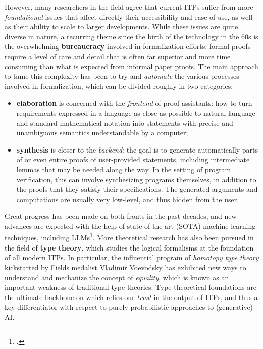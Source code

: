 \documentclass[12pt,draftproposal]{msca-pf}
\begin{document}
However, many researchers in the field agree that current ITPs suffer from more \emph{foundational}
issues that affect directly their accessibility and ease of use, as well as their ability to scale
to larger developments. While these issues are quite diverse in nature, a recurring theme since the
birth of the technology in the 60s is the overwhelming \textbf{bureaucracy} involved in
formalization efforts: formal proofs require a level of care and detail that is often far superior
and more time consuming than what is expected from informal paper proofs.
The main approach to tame this complexity has been to try and \emph{automate} the various processes
involved in formalization, which can be divided roughly in two categories:
\begin{itemize}
    \item \textbf{elaboration} is concerned with the \emph{frontend} of proof assistants: how to
    turn requirements expressed in a language as close as possible to natural language and
    standard mathematical notation into statements with precise and unambiguous semantics
    understandable by a computer;
    \item \textbf{synthesis} is closer to the \emph{backend}: the goal is to generate automatically
    parts of or even entire proofs of user-provided statements, including intermediate lemmas
    that may be needed along the way. In the setting of program verification, this can involve
    synthesizing programs themselves, in addition to the proofs that they satisfy their
    specifications. The generated arguments and computations are usually very low-level, and thus
    hidden from the user.
\end{itemize}
Great progress has been made on both fronts in the past decades, and new advances are expected with
the help of state-of-the-art (SOTA) machine learning techniques, including LLMs\footcite{Cite again
Lean FRO roadmap?}.
More theoretical research has also been pursued in the field of
\textbf{type theory}, which studies the logical formalisms at the foundation of all modern ITPs. In
particular, the influential program of \emph{homotopy type theory} kickstarted by Fields medalist
Vladimir Voevodsky has exhibited new ways to understand and mechanize the concept of
\emph{equality}, which is known as an important weakness of traditional type theories.
Type-theoretical foundations are the ultimate backbone on which relies our \emph{trust} in the
output of ITPs, and thus a key differentiator with respect to purely probabilistic approaches to
(generative) AI.
\end{document}
